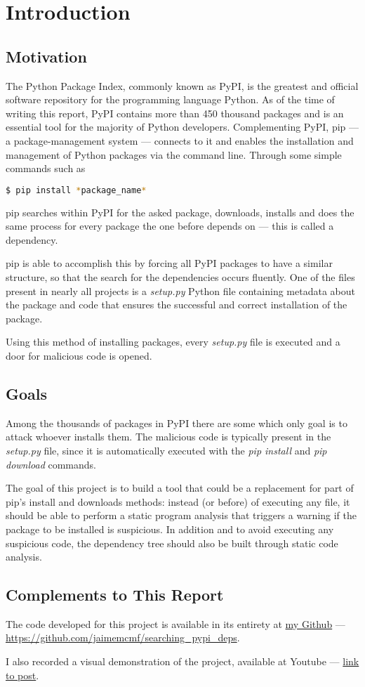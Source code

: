 \chapter{Introduction}
\section{Motivation}
The Python Package Index, commonly known as PyPI, is the greatest and official software repository for the programming language Python. As of the time of writing this report, PyPI contains more than 450 thousand packages and is an essential tool for the majority of Python developers.
Complementing PyPI, pip — a package-management system — connects to it and enables the installation and management of Python packages via the command line.
Through some simple commands such as
\bigskip
\begin{lstlisting}[language=bash]
  $ pip install *package_name*
\end{lstlisting}
\bigskip
pip searches within PyPI for the asked package, downloads, installs and does the same process for every package the one before depends on — this is called a dependency.

pip is able to accomplish this by forcing all PyPI packages to have a similar structure, so that the search for the dependencies occurs fluently. One of the files present in nearly all projects is a \textit{setup.py} Python file containing metadata about the package and code that ensures the successful and correct installation of the package.

Using this method of installing packages, every \textit{setup.py} file is executed and a door for malicious code is opened.

\section{Goals}
Among the thousands of packages in PyPI there are some which only goal is to attack whoever installs them. The malicious code is typically present in the \textit{setup.py} file, since it is automatically executed with the \textit{pip install} and \textit{pip download} commands.

The goal of this project is to build a tool that could be a replacement for part of pip's install and downloads methods: instead (or before) of executing any file, it should be able to perform a static program analysis that triggers a warning if the package to be installed is suspicious. In addition and to avoid executing any suspicious code, the dependency tree should also be built through static code analysis.

\section{Complements to This Report}
The code developed for this project is available in its entirety at \href{https://github.com/jaimemcmf/searching_pypi_deps}{my Github} — \url{https://github.com/jaimemcmf/searching_pypi_deps}.

I also recorded a visual demonstration of the project, available at Youtube — \url{link to post}.

